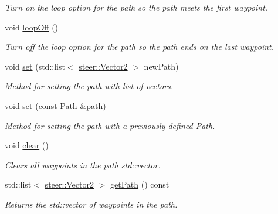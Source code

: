 \begin{DoxyCompactItemize}
\begin{DoxyCompactList}\small\item\em Turn on the loop option for the path so the path meets the first waypoint. \end{DoxyCompactList}\item 
\hypertarget{classsteer_1_1_path_a0f872c277f30488a9eed65acf3934093}{void \hyperlink{classsteer_1_1_path_a0f872c277f30488a9eed65acf3934093}{loop\-Off} ()}\label{classsteer_1_1_path_a0f872c277f30488a9eed65acf3934093}

\begin{DoxyCompactList}\small\item\em Turn off the loop option for the path so the path ends on the last waypoint. \end{DoxyCompactList}\item 
void \hyperlink{classsteer_1_1_path_abd66161db6441fad51d5cda43f7c0b13}{set} (std\-::list$<$ \hyperlink{structsteer_1_1_vector2}{steer\-::\-Vector2} $>$ new\-Path)
\begin{DoxyCompactList}\small\item\em Method for setting the path with list of vectors. \end{DoxyCompactList}\item 
void \hyperlink{classsteer_1_1_path_a9bf49c27d91fe8316a866d4483574a13}{set} (const \hyperlink{classsteer_1_1_path}{Path} \&path)
\begin{DoxyCompactList}\small\item\em Method for setting the path with a previously defined \hyperlink{classsteer_1_1_path}{Path}. \end{DoxyCompactList}\item 
\hypertarget{classsteer_1_1_path_a76d63db05197b28767e5fa13befb7dbe}{void \hyperlink{classsteer_1_1_path_a76d63db05197b28767e5fa13befb7dbe}{clear} ()}\label{classsteer_1_1_path_a76d63db05197b28767e5fa13befb7dbe}

\begin{DoxyCompactList}\small\item\em Clears all waypoints in the path std\-::vector. \end{DoxyCompactList}\item 
\hypertarget{classsteer_1_1_path_aedf4d447eb5286a3ff16562ee34c5bcd}{std\-::list$<$ \hyperlink{structsteer_1_1_vector2}{steer\-::\-Vector2} $>$ \hyperlink{classsteer_1_1_path_aedf4d447eb5286a3ff16562ee34c5bcd}{get\-Path} () const }\label{classsteer_1_1_path_aedf4d447eb5286a3ff16562ee34c5bcd}

\begin{DoxyCompactList}\small\item\em Returns the std\-::vector of waypoints in the path. \end{DoxyCompactList}\end{DoxyCompactItemize}


